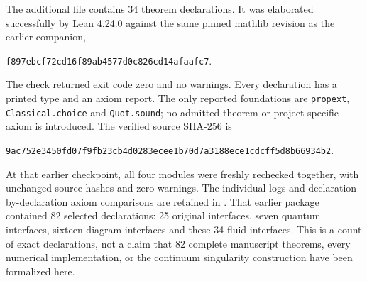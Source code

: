 The additional file  contains 34 theorem declarations. It was elaborated successfully by Lean 4.24.0 against the same pinned mathlib revision as the earlier companion,
\begin{center}\small\texttt{f897ebcf72cd16f89ab4577d0c826cd14afaafc7}.\end{center}
The check returned exit code zero and no warnings. Every declaration has a printed type and an axiom report. The only reported foundations are \texttt{propext}, \texttt{Classical.choice} and \texttt{Quot.sound}; no admitted theorem or project-specific axiom is introduced. The verified source SHA-256 is
\begin{center}\scriptsize
\texttt{9ac752e3450fd07f9fb23cb4d0283ecee1b70d7a3188ece1cdcff5d8b66934b2}.
\end{center}
At that earlier checkpoint, all four modules were freshly rechecked together, with unchanged source hashes and zero warnings. The individual logs and declaration-by-declaration axiom comparisons are retained in . That earlier package contained 82 selected declarations: 25 original interfaces, seven quantum interfaces, sixteen diagram interfaces and these 34 fluid interfaces. This is a count of exact declarations, not a claim that 82 complete manuscript theorems, every numerical implementation, or the continuum singularity construction have been formalized here.

